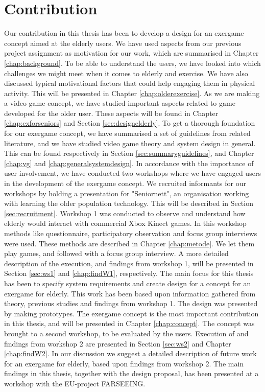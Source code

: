 \section{Contribution}
Our contribution in this thesis has been to develop a design for an exergame concept aimed at the elderly users. We have used aspects from our previous project assignment as motivation for our work, which are summarised in Chapter \ref{chap:background}. To be able to understand the users, we have looked into which challenges we might meet when it comes to elderly and exercise. We have also discussed typical motivational factors that could help engaging them in physical activity. This will be presented in Chapter \ref{chap:olderexercise}. As we are making a video game concept, we have studied important aspects related to game developed for the older user. These aspects will be found in Chapter \ref{chap:exforseniors} and Section \ref{sec:designelderly}. To get a thorough foundation for our exergame concept, we have summarised a set of guidelines from related literature, and we have studied video game theory and system design in general. This can be found respectively in Section \ref{sec:summaryguidelines}, and Chapter \ref{chap:vg} and \ref{chap:generalsystemdesign}. In accordance with the importance of user involvement, we have conducted two workshops where we have engaged users in the development of the exergame concept. We recruited informants for our workshops by holding a presentation for "Seniornett", an organisation working with learning the older population technology. This will be described in Section \ref{sec:recruitment}. Workshop 1 was conducted to observe and understand how elderly would interact with commercial Xbox Kinect games. In this workshop methods like questionnaire, participatory observation and focus group interviews were used. These methods are described in Chapter \ref{chap:metode}. We let them play games, and followed with a focus group interview. A more detailed description of the execution, and findings from workshop 1, will be presented in Section \ref{sec:ws1} and \ref{chap:findW1}, respectively. The main focus for this thesis has been to specify system requirements and create design for a concept for an exergame for elderly. This work has been based upon information gathered from theory, previous studies and findings from workshop 1. The design was presented by making prototypes. The exergame concept is the most important contribution in this thesis, and will be presented in Chapter \ref{chap:concept}. The concept was brought to a second workshop, to be evaluated by the users. Execution of and findings from workshop 2 are presented in Section \ref{sec:ws2} and Chapter \ref{chap:findW2}. In our discussion we suggest a detailed description of future work for an exergame for elderly, based upon findings from workshop 2. The main findings in this thesis, together with the design proposal, has been presented at a workshop with the EU-project FARSEEING.  

